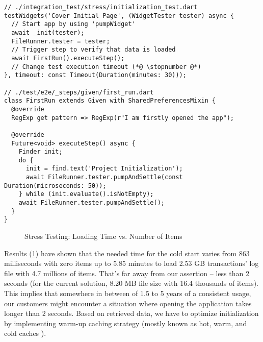 \begin{lstlisting}
// ./integration_test/stress/initialization_test.dart
testWidgets('Cover Initial Page', (WidgetTester tester) async {
  // Start app by using 'pumpWidget'
  await _init(tester);
  FileRunner.tester = tester;
  // Trigger step to verify that data is loaded
  await FirstRun().executeStep();
  // Change test execution timeout (*@ \stopnumber @*)
}, timeout: const Timeout(Duration(minutes: 30)));

// ./test/e2e/_steps/given/first_run.dart
class FirstRun extends Given with SharedPreferencesMixin {
  @override
  RegExp get pattern => RegExp(r"I am firstly opened the app");

  @override
  Future<void> executeStep() async {
    Finder init;
    do {
      init = find.text('Project Initialization');
      await FileRunner.tester.pumpAndSettle(const Duration(microseconds: 50));
    } while (init.evaluate().isNotEmpty);
    await FileRunner.tester.pumpAndSettle();
  }
}
\end{lstlisting}

\begin{figure}
\caption{Stress Testing: Loading Time vs. Number of Items} \label{t-stress}
\end{figure}

\noindent Results (\cref{t-stress}) have shown that the needed time for the cold start varies from 863 milliseconds  
with zero items up to 5.85 minutes to load 2.53 GB transactions' log file with 4.7 millions of items. That's far away 
from our assertion -- less than 2 seconds (for the current solution, 8.20 MB file size with 16.4 thousands of items).
This implies that somewhere in between of 1.5 to 5 years of a consistent usage, our customers might encounter a 
situation where opening the application takes longer than 2 seconds. Based on retrieved data, we have to optimize  
initialization by implementing warm-up caching strategy (mostly known as hot, warm, and cold caches \cite{Tom17}). 



